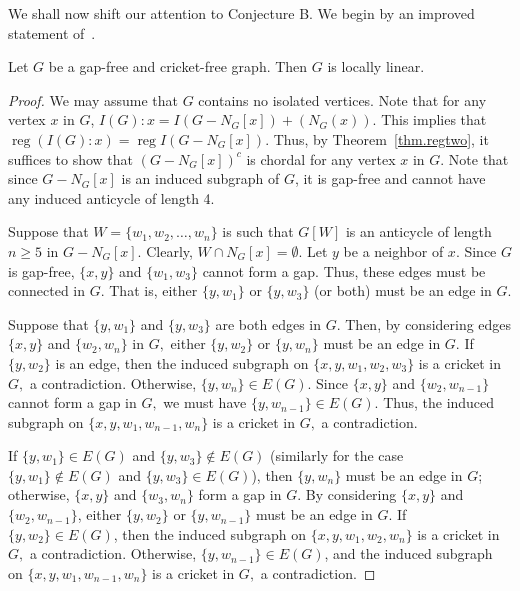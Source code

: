 \documentclass[ALCO,ThmDefs,Unicode,epreuves]{cedram}
\DeclareMathOperator{\reg}{reg}
\newcommand*{\reg}{\mathrm{reg}}
\begin{document}
We shall now shift our attention to Conjecture B. We begin by an improved statement of~\cite[Corollary 6.5]{CHHKTT}.

\begin{lemm}\label{lem.locallinear}
Let $G$ be a gap-free and cricket-free graph. Then $G$ is locally linear.
\end{lemm}

\begin{proof} We may assume that $G$ contains no isolated vertices. Note that for any vertex $x$ in $G$, $I(G):x = I(G - N_G[x]) + (N_G(x))$. This implies that $\reg (I(G):x) = \reg I(G- N_G[x])$. Thus, by Theorem~\ref{thm.regtwo}, it suffices to show that $(G - N_G[x])^c$ is chordal for any vertex $x$ in $G$. Note that since $G - N_G[x]$ is an induced subgraph of $G$, it is gap-free and cannot have any induced anticycle of length 4.

Suppose that $W = \{w_1,w_2,\dots,w_n\}$ is such that $G[W]$ is an anticycle of length $n \ge 5$ in $G - N_G[x].$ Clearly, $W \cap N_G[x] = \emptyset$. Let $y$ be a neighbor of $x$. Since $G$ is gap-free, $\{x,y\}$ and $\{w_1,w_3\}$ cannot form a gap. Thus, these edges must be connected in $G$. That is, either $\{y,w_1\}$ or $\{y,w_3\}$ (or both) must be an edge in $G$.

Suppose that $\{y,w_1\}$ and $\{y,w_3\}$ are both edges in $G.$ Then, by considering edges $\{x,y\}$ and $\{w_2,w_n\}$ in $G,$ either $\{y,w_2\}$ or $\{y,w_n\}$ must be an edge in $G.$ If $\{y,w_2\}$ is an edge, then the induced subgraph on $\{x,y,w_1,w_2,w_3\}$ is a cricket in $G,$ a contradiction. Otherwise, $\{y,w_n\} \in E(G)$. Since $\{x,y\}$ and $\{w_2,w_{n-1}\}$ cannot form a gap in $G,$ we must have $\{y,w_{n-1}\} \in E(G)$. Thus, the induced subgraph on $\{x,y,w_1,w_{n-1},w_n\}$ is a cricket in $G,$ a contradiction.

If $\{y,w_1\} \in E(G)$ and $\{y,w_3\} \not\in E(G)$ (similarly for the case $\{y,w_1\} \not\in E(G)$ and $\{y,w_3\} \in E(G)$), then $\{y,w_n\}$ must be an edge in $G$; otherwise, $\{x,y\}$ and $\{w_3,w_n\}$ form a gap in $G.$ By considering $\{x,y\}$ and $\{w_2,w_{n-1}\}$, either $\{y,w_2\}$ or $\{y,w_{n-1}\}$ must be an edge in $G.$ If $\{y,w_2\} \in E(G)$, then the induced subgraph on $\{x,y,w_1,w_2,w_n\}$ is a cricket in $G,$ a contradiction. Otherwise, $\{y,w_{n-1}\} \in E(G)$, and the induced subgraph on $\{x,y,w_1,w_{n-1},w_n\}$ is a cricket in $G,$ a contradiction.
\end{proof}
\end{document}
